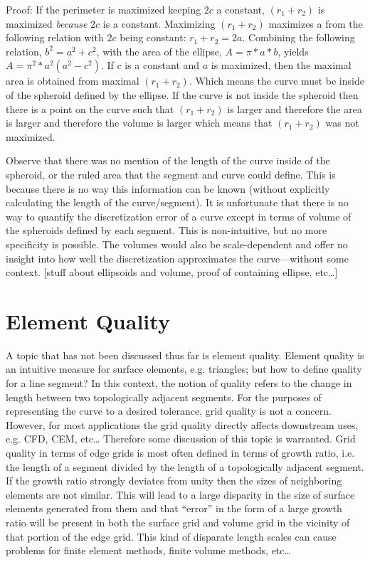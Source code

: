 \documentclass[preprint,12pt]{elsarticle}
\begin{document}
Proof: If the perimeter is maximized keeping $2c$ a constant, $(r_1 + r_2)$ is maximized \textit{because} $2c$ is a constant.  Maximizing $(r_1+r_2)$ maximizes a from the following relation with $2c$ being constant: $r_1 + r_2 = 2a$.  Combining the following relation, $b^2 = a^2 + c^2$, with the area of the ellipse, $A = \pi * a * b$, yields $A=\pi^{2}*a^{2}(a^{2} - c^2)$.  If $c$ is a constant and $a$ is maximized, then the maximal area is obtained from maximal $(r_1+r_2)$.  Which means the curve must be inside of the spheroid defined by the ellipse.  If the curve is not inside the spheroid then there is a point on the curve such that $(r_1+r_2)$ is larger and therefore the area is larger and therefore the volume is larger which means that $(r_1+r_2)$ was not maximized.

        Observe that there was no mention of the length of the curve inside of the spheroid, or the ruled area that the segment and curve could define.  This is because there is no way this information can be known (without explicitly calculating the length of the curve/segment).  It is unfortunate that there is no way to quantify the discretization error of a curve except in terms of volume of the spheroids defined by each segment.  This is non-intuitive, but no more specificity is possible.  The volumes would also be scale-dependent and offer no insight into how well the discretization approximates the curve—without some context.
[stuff about ellipsoids and volume, proof of containing ellipse, etc…]

\section{Element Quality}
A topic that has not been discussed thus far is element quality.  Element quality is an intuitive measure for surface elements, e.g. triangles; but how to define quality for a line segment?  In this context, the notion of quality refers to the change in length between two topologically adjacent segments.  For the purposes of representing the curve to a desired tolerance, grid quality is not a concern.  However, for most applications the grid quality directly affects downstream uses, e.g. CFD, CEM, etc…  Therefore some discussion of this topic is warranted.  Grid quality in terms of edge grids is most often defined in terms of growth ratio, i.e. the length of a segment divided by the length of a topologically adjacent segment.  If the growth ratio strongly deviates from unity then the sizes of neighboring elements are not similar.  This will lead to a large disparity in the size of surface elements generated from them and that “error” in the form of a large growth ratio will be present in both the surface grid and volume grid in the vicinity of that portion of the edge grid.  This kind of disparate length scales can cause problems for finite element methods, finite volume methods, etc…
\end{document}
